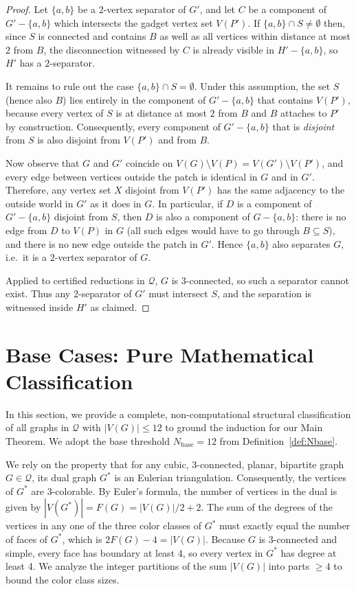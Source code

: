 \documentclass[12pt]{article}
\theoremstyle{definition}
\begin{document}
\begin{proof}
Let $\{a,b\}$ be a $2$-vertex separator of $G'$, and let $C$ be a component of $G'-\{a,b\}$ which intersects the gadget vertex set $V(P')$.
If $\{a,b\}\cap S\neq\emptyset$ then, since $S$ is connected and contains $B$ as well as all vertices within distance at most $2$ from $B$, the disconnection witnessed by $C$ is already visible in $H'-\{a,b\}$, so $H'$ has a $2$-separator.

It remains to rule out the case $\{a,b\}\cap S=\emptyset$.
Under this assumption, the set $S$ (hence also $B$) lies entirely in the component of $G'-\{a,b\}$ that contains $V(P')$, because every vertex of $S$ is at distance at most $2$ from $B$ and $B$ attaches to $P'$ by construction.
Consequently, every component of $G'-\{a,b\}$ that is \emph{disjoint} from $S$ is also disjoint from $V(P')$ and from $B$.

Now observe that $G$ and $G'$ coincide on $V(G)\setminus V(P)=V(G')\setminus V(P')$, and every edge between vertices outside the patch is identical in $G$ and in $G'$.
Therefore, any vertex set $X$ disjoint from $V(P')$ has the same adjacency to the outside world in $G'$ as it does in $G$.
In particular, if $D$ is a component of $G'-\{a,b\}$ disjoint from $S$, then $D$ is also a component of $G-\{a,b\}$:
there is no edge from $D$ to $V(P)$ in $G$ (all such edges would have to go through $B\subseteq S$), and there is no new edge outside the patch in $G'$.
Hence $\{a,b\}$ also separates $G$, i.e.\ it is a $2$-vertex separator of $G$.

Applied to certified reductions in $\mathcal{Q}$, $G$ is $3$-connected, so such a separator cannot exist. Thus any $2$-separator of $G'$ must intersect $S$, and the separation is witnessed inside $H'$ as claimed.
\end{proof}


\section{Base Cases: Pure Mathematical Classification}
\label{sec:base-cases}

In this section, we provide a complete, non-computational structural classification of all graphs in $\mathcal{Q}$ with $|V(G)| \le 12$ to ground the induction for our Main Theorem. We adopt the base threshold $N_{\mathrm{base}}=12$ from Definition~\ref{def:Nbase}.

We rely on the property that for any cubic, 3-connected, planar, bipartite graph $G \in \mathcal{Q}$, its dual graph $G^*$ is an Eulerian triangulation. Consequently, the vertices of $G^*$ are 3-colorable.
By Euler's formula, the number of vertices in the dual is given by $|V(G^*)| = F(G) = |V(G)|/2 + 2$. The sum of the degrees of the vertices in any one of the three color classes of $G^*$ must exactly equal the number of faces of $G^*$, which is $2F(G) - 4 = |V(G)|$. Because $G$ is 3-connected and simple, every face has boundary at least 4, so every vertex in $G^*$ has degree at least 4. We analyze the integer partitions of the sum $|V(G)|$ into parts $\ge 4$ to bound the color class sizes.
\end{document}
